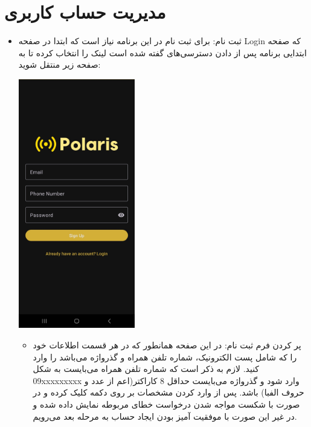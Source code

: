 \section{مدیریت حساب کاربری}
\begin{itemize}
	\item  ثبت نام: برای ثبت نام در این برنامه نیاز است که ابتدا در صفحه Login که صفحه ابتدایی برنامه پس از دادن دسترسی‌های گفته شده است لینک  را انتخاب کرده تا به صفحه زیر منتقل شوید:
	\begin{center}
		\includegraphics[width=0.4\textwidth]{images/signup-empty.jpg}
	\end{center}
	\begin{itemize}
		\item پر کردن فرم ثبت نام:
		در این صفحه همانطور که در هر قسمت اطلاعات خود را که شامل پست الکترونیک، شماره تلفن همراه و گذرواژه می‌باشد را وارد کنید. لازم به ذکر است که شماره تلفن همراه می‌بایست به شکل 09xxxxxxxxx وارد شود و گذرواژه می‌بایست حداقل 8 کاراکتر(اعم از عدد و حروف الفبا) باشد. پس از وارد کردن مشخصات بر روی دکمه  کلیک کرده و در صورت با شکست مواجه شدن درخواست خطای مربوطه نمایش داده شده و در غیر این صورت با موفقیت آمیز بودن ایجاد حساب به مرحله بعد می‌رویم.


\end{itemize}
\end{itemize}

